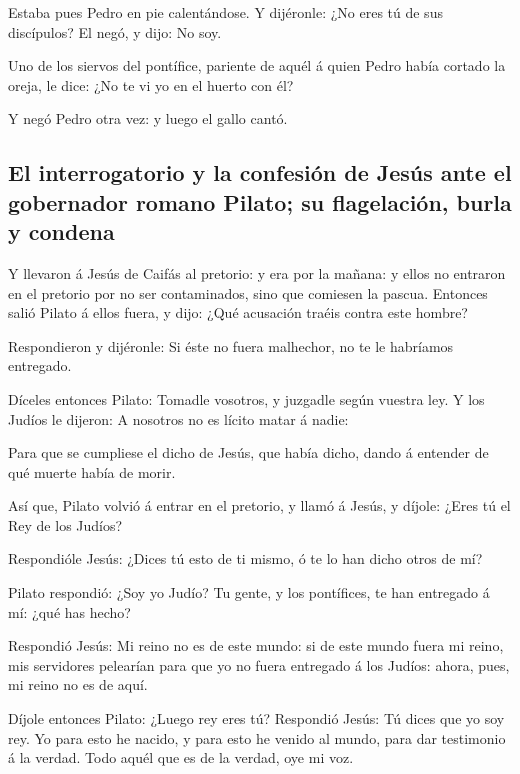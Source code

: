  Estaba pues Pedro en pie calentándose. Y dijéronle: ¿No
eres tú de sus discípulos? El negó, y dijo: No soy.

 Uno de los siervos del pontífice, pariente de aquél á
quien Pedro había cortado la oreja, le dice: ¿No te vi yo en el huerto
con él?

 Y negó Pedro otra vez: y luego el gallo cantó.

\hypertarget{el-interrogatorio-y-la-confesiuxf3n-de-jesuxfas-ante-el-gobernador-romano-pilato-su-flagelaciuxf3n-burla-y-condena}{%
\subsection{El interrogatorio y la confesión de Jesús ante el gobernador
romano Pilato; su flagelación, burla y
condena}\label{el-interrogatorio-y-la-confesiuxf3n-de-jesuxfas-ante-el-gobernador-romano-pilato-su-flagelaciuxf3n-burla-y-condena}}

 Y llevaron á Jesús de Caifás al pretorio: y era por la
mañana: y ellos no entraron en el pretorio por no ser contaminados, sino
que comiesen la pascua.  Entonces salió Pilato á ellos
fuera, y dijo: ¿Qué acusación traéis contra este hombre?

 Respondieron y dijéronle: Si éste no fuera malhechor, no
te le habríamos entregado.

 Díceles entonces Pilato: Tomadle vosotros, y juzgadle
según vuestra ley. Y los Judíos le dijeron: A nosotros no es lícito
matar á nadie:

 Para que se cumpliese el dicho de Jesús, que había dicho,
dando á entender de qué muerte había de morir.

 Así que, Pilato volvió á entrar en el pretorio, y llamó á
Jesús, y díjole: ¿Eres tú el Rey de los Judíos?

 Respondióle Jesús: ¿Dices tú esto de ti mismo, ó te lo han
dicho otros de mí?

 Pilato respondió: ¿Soy yo Judío? Tu gente, y los
pontífices, te han entregado á mí: ¿qué has hecho?

 Respondió Jesús: Mi reino no es de este mundo: si de este
mundo fuera mi reino, mis servidores pelearían para que yo no fuera
entregado á los Judíos: ahora, pues, mi reino no es de aquí.

 Díjole entonces Pilato: ¿Luego rey eres tú? Respondió
Jesús: Tú dices que yo soy rey. Yo para esto he nacido, y para esto he
venido al mundo, para dar testimonio á la verdad. Todo aquél que es de
la verdad, oye mi voz.

